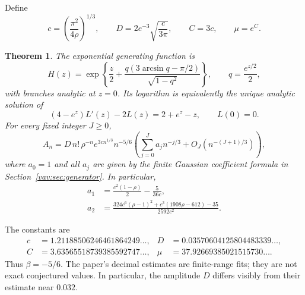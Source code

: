 \documentclass[11pt]{article}
\newtheorem{theorem}{Theorem}[section]
\theoremstyle{remark}\newtheorem{remark}[theorem]{Remark}
\begin{document}
Define
\begin{equation}\label{vav:eq:constants}
 c=\left(\frac{\pi^2}{4\rho}\right)^{1/3},\qquad
 D=2e^{-3}\sqrt{\frac{c}{3\pi}},\qquad C=3c,\qquad \mu=e^C.
\end{equation}
\begin{theorem}\label{vav:thm:main}
The exponential generating function is
\begin{equation}\label{vav:eq:egf}
 H(z)=\exp\left\{\frac z2+
 \frac{q(3\arcsin q-\pi/2)}{\sqrt{1-q^2}}\right\},
 \qquad q=\frac{e^{z/2}}2,
\end{equation}
with branches analytic at $z=0$. Its logarithm is equivalently the unique
analytic solution of
\begin{equation}\label{vav:eq:ode}
 (4-e^z)L'(z)-2L(z)=2+e^z-z,\qquad L(0)=0.
\end{equation}
For every fixed integer $J\ge0$,
\begin{equation}\label{vav:eq:main}
 A_n=D\,n!\,\rho^{-n}e^{3cn^{1/3}}n^{-5/6}
 \left(\sum_{j=0}^{J}a_jn^{-j/3}
       +O_J(n^{-(J+1)/3})\right),
\end{equation}
where $a_0=1$ and all $a_j$ are given by the finite Gaussian coefficient
formula in Section~\ref{vav:sec:generator}. In particular,
\begin{align}
 a_1&=\frac{c^2(1-\rho)}2-\frac5{36c},\label{vav:eq:a1}\\
 a_2&=\frac{324c^6(\rho-1)^2+c^3(1908\rho-612)-35}{2592c^2}.
 \label{vav:eq:a2}
\end{align}
\end{theorem}

The constants are
\begin{align*}
 c&=1.21188506246461864249\ldots,&
 D&=0.03570604125804483339\ldots,\\
 C&=3.63565518739385592747\ldots,&
 \mu&=37.92669385021515730\ldots.
\end{align*}
Thus $\beta=-5/6$. The paper's decimal estimates are finite-range fits;
they are not exact conjectured values. In particular, the amplitude
$D$ differs visibly from their estimate near $0.032$.
\end{document}
